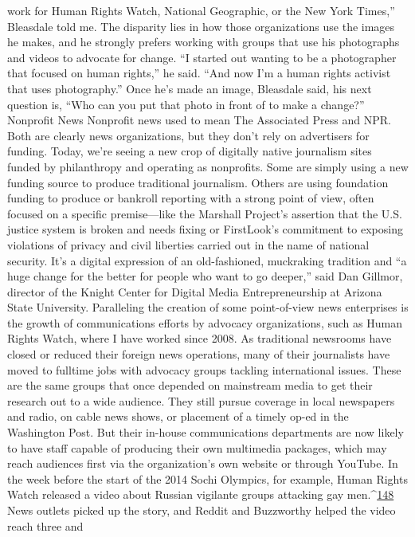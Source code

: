 work for Human Rights Watch, National Geographic, or the New York Times,'' Bleasdale
told me. The disparity lies in how those organizations use the images he makes, and he
strongly prefers working with groups that use his photographs and videos to advocate for
change. ``I started out wanting to be a photographer that focused on human rights,'' he
said. ``And now I’m a human rights activist that uses photography.'' Once he’s made an
image, Bleasdale said, his next question is, ``Who can you put that photo in front of to
make a change?''
Nonprofit News
Nonprofit news used to mean The Associated Press and NPR. Both are clearly news
organizations, but they don’t rely on advertisers for funding. Today, we’re seeing a new
crop of digitally native journalism sites funded by philanthropy and operating as
nonprofits. Some are simply using a new funding source to produce traditional
journalism. Others are using foundation funding to produce or bankroll reporting with a
strong point of view, often focused on a specific premise—like the Marshall Project’s
assertion that the U.S. justice system is broken and needs fixing or FirstLook’s
commitment to exposing violations of privacy and civil liberties carried out in the name
of national security. It’s a digital expression of an old-fashioned, muckraking tradition
and ``a huge change for the better for people who want to go deeper,'' said Dan Gillmor,
director of the Knight Center for Digital Media Entrepreneurship at Arizona State
University.
Paralleling the creation of some point-of-view news enterprises is the growth of
communications efforts by advocacy organizations, such as Human Rights Watch, where
I have worked since 2008. As traditional newsrooms have closed or reduced their foreign
news operations, many of their journalists have moved to fulltime jobs with advocacy
groups tackling international issues. These are the same groups that once depended on
mainstream media to get their research out to a wide audience. They still pursue coverage
in local newspapers and radio, on cable news shows, or placement of a timely op-ed in
the Washington Post. But their in-house communications departments are now likely to
have staff capable of producing their own multimedia packages, which may reach
audiences first via the organization’s own website or through YouTube.
In the week before the start of the 2014 Sochi Olympics, for example, Human Rights
Watch released a video about Russian vigilante groups attacking gay men.^{\href{#endnotes}{148}} News
outlets picked up the story, and Reddit and Buzzworthy helped the video reach three and
